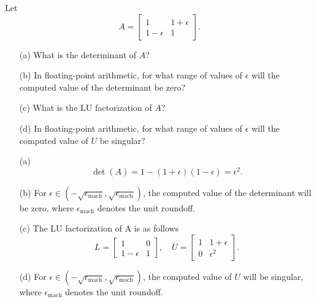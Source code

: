 \begin{pro}
  Let
  \begin{displaymath}
    A =
    \begin{bmatrix}
      1 & 1+\epsilon \\
      1-\epsilon & 1
    \end{bmatrix}.
  \end{displaymath}
\end{pro}
\begin{itemize}
\item[(a)]
  What is the determinant of $A$?

\item[(b)]
  In floating-point arithmetic,
  for what range of values of $\epsilon$
  will the computed value of the determinant be zero?

\item[(c)]
  What is the LU factorization of $A$?

\item[(d)]
  In floating-point arithmetic,
  for what range of values of $\epsilon$
  will the computed value of $U$ be singular?
\end{itemize}

\begin{sol}
  \begin{itemize}
  \item[(a)]
    \begin{displaymath}
      \det(A) = 1 - (1+\epsilon)(1-\epsilon) = \epsilon^2.
    \end{displaymath}

  \item[(b)]
    For $\epsilon\in(-\sqrt{\epsilon_{\text{mach}}},
    \sqrt{\epsilon_{\text{mach}}})$,
    the computed value of the determinant will be zero,
    where $\epsilon_{\text{mach}}$ denotes the unit roundoff.

  \item[(c)]
    The LU factorization of A is as follows
    \begin{displaymath}
      L =
      \begin{bmatrix}
        1 & 0 \\
        1-\epsilon & 1
      \end{bmatrix},
      \quad
      U =
      \begin{bmatrix}
        1 & 1+\epsilon \\
        0 & \epsilon^2
      \end{bmatrix}.
    \end{displaymath}

  \item[(d)]
    For $\epsilon\in(-\sqrt{\epsilon_{\text{mach}}},
    \sqrt{\epsilon_{\text{mach}}})$,
    the computed value of $U$ will be singular,
    where $\epsilon_{\text{mach}}$ denotes the unit roundoff.
  \end{itemize}
\end{sol}
